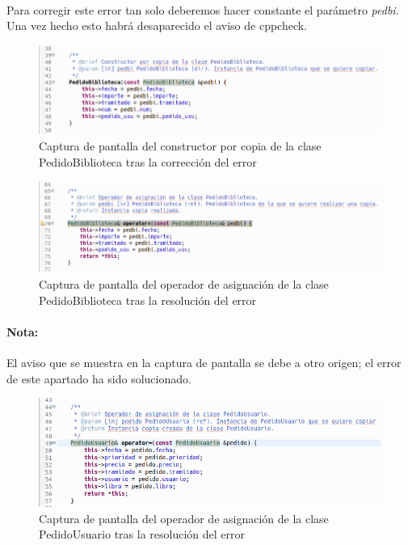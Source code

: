 		\paragraph{}Para corregir este error tan solo deberemos hacer constante el parámetro \textit{pedbi}. Una vez hecho esto habrá desaparecido el aviso de cppcheck.
		
		\begin{figure}[H]
			\centering
			\includegraphics[scale=0.55]{img/captura56.png}
			\caption{Captura de pantalla del constructor por copia de la clase PedidoBiblioteca tras la corrección del error}
			\label{captura56}
		\end{figure}
	
		\begin{figure}[H]
			\centering
			\includegraphics[scale=0.5]{img/captura59.png}
			\caption{Captura de pantalla del operador de asignación de la clase PedidoBiblioteca tras la resolución del error}
			\label{captura59}
		\end{figure}
	
		\paragraph{Nota:}El aviso que se muestra en la captura de pantalla se debe a otro origen; el error de este apartado ha sido solucionado.
		
		\begin{figure}[H]
			\centering
			\includegraphics[scale=0.55]{img/captura60.png}
			\caption{Captura de pantalla del operador de asignación de la clase PedidoUsuario tras la resolución del error}
			\label{captura60}
		\end{figure}
		
